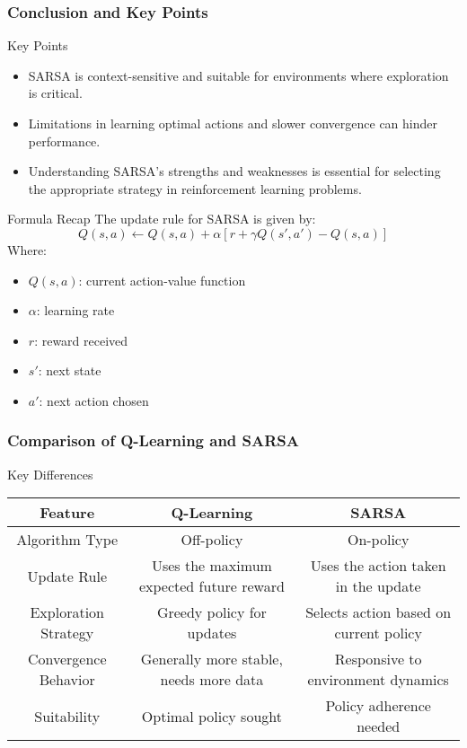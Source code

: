 \documentclass[aspectratio=169]{beamer}
\begin{document}
\begin{frame}[fragile]
    \frametitle{Conclusion and Key Points}
    \begin{block}{Key Points}
        \begin{itemize}
            \item SARSA is context-sensitive and suitable for environments where exploration is critical.
            \item Limitations in learning optimal actions and slower convergence can hinder performance.
            \item Understanding SARSA's strengths and weaknesses is essential for selecting the appropriate strategy in reinforcement learning problems.
        \end{itemize}
    \end{block}
    
    \begin{block}{Formula Recap}
        The update rule for SARSA is given by:
        \begin{equation}
        Q(s, a) \gets Q(s, a) + \alpha \left[ r + \gamma Q(s', a') - Q(s, a) \right]
        \end{equation}
        Where:
        \begin{itemize}
            \item $Q(s, a)$: current action-value function
            \item $\alpha$: learning rate
            \item $r$: reward received
            \item $s'$: next state
            \item $a'$: next action chosen
        \end{itemize}
    \end{block}
\end{frame}

\begin{frame}[fragile]
    \frametitle{Comparison of Q-Learning and SARSA}
    \begin{block}{Key Differences}
        \begin{tabular}{|c|c|c|}
            \hline
            \textbf{Feature} & \textbf{Q-Learning} & \textbf{SARSA} \\
            \hline
            Algorithm Type & Off-policy & On-policy \\
            \hline
            Update Rule & Uses the maximum expected future reward & Uses the action taken in the update \\
            \hline
            Exploration Strategy & Greedy policy for updates & Selects action based on current policy \\
            \hline
            Convergence Behavior & Generally more stable, needs more data & Responsive to environment dynamics \\
            \hline
            Suitability & Optimal policy sought & Policy adherence needed \\
            \hline
        \end{tabular}
    \end{block}
\end{frame}
\end{document}
